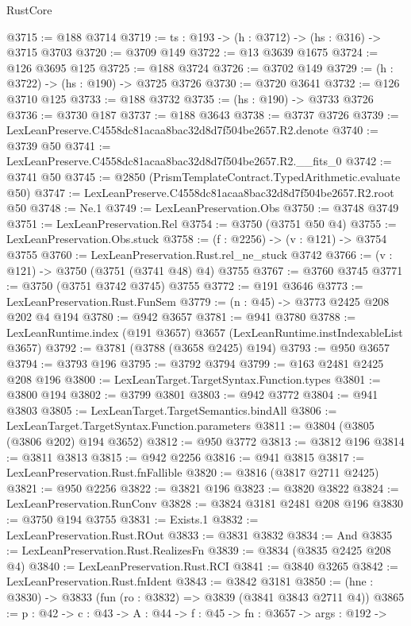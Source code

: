 \begin{lexlean}{RustCore}
\begin{coremodule}
@3715 := @188 @3714
@3719 := {ts : @193} -> (h : @3712) -> (hs : @316) -> @3715 @3703
@3720 := @3709 @149
@3722 := @13 @3639 @1675
@3724 := @126 @3695 @125
@3725 := @188 @3724
@3726 := @3702 @149
@3729 := (h : @3722) -> (hs : @190) -> @3725 @3726
@3730 := @3720 @3641
@3732 := @126 @3710 @125
@3733 := @188 @3732
@3735 := (hs : @190) -> @3733 @3726
@3736 := @3730 @187
@3737 := @188 @3643
@3738 := @3737 @3726
@3739 := LexLeanPreserve.C4558dc81acaa8bac32d8d7f504be2657.R2.denote
@3740 := @3739 @50
@3741 := LexLeanPreserve.C4558dc81acaa8bac32d8d7f504be2657.R2.__fits_0
@3742 := @3741 @50
@3745 := @2850 (PrismTemplateContract.TypedArithmetic.evaluate @50)
@3747 := LexLeanPreserve.C4558dc81acaa8bac32d8d7f504be2657.R2.root @50
@3748 := Ne.{1}
@3749 := LexLeanPreservation.Obs
@3750 := @3748 @3749
@3751 := LexLeanPreservation.Rel
@3754 := @3750 (@3751 @50 @4)
@3755 := LexLeanPreservation.Obs.stuck
@3758 := (f : @2256) -> (v : @121) -> @3754 @3755
@3760 := LexLeanPreservation.Rust.rel_ne_stuck @3742
@3766 := (v : @121) -> @3750 (@3751 (@3741 @48) @4) @3755
@3767 := @3760 @3745
@3771 := @3750 (@3751 @3742 @3745) @3755
@3772 := @191 @3646
@3773 := LexLeanPreservation.Rust.FunSem
@3779 := (n : @45) -> @3773 @2425 @208 @202 @4 @194
@3780 := @942 @3657
@3781 := @941 @3780
@3788 := LexLeanRuntime.index (@191 @3657) @3657 (LexLeanRuntime.instIndexableList @3657)
@3792 := @3781 (@3788 (@3658 @2425) @194)
@3793 := @950 @3657
@3794 := @3793 @196
@3795 := @3792 @3794
@3799 := @163 @2481 @2425 @208 @196
@3800 := LexLeanTarget.TargetSyntax.Function.types
@3801 := @3800 @194
@3802 := @3799 @3801
@3803 := @942 @3772
@3804 := @941 @3803
@3805 := LexLeanTarget.TargetSemantics.bindAll
@3806 := LexLeanTarget.TargetSyntax.Function.parameters
@3811 := @3804 (@3805 (@3806 @202) @194 @3652)
@3812 := @950 @3772
@3813 := @3812 @196
@3814 := @3811 @3813
@3815 := @942 @2256
@3816 := @941 @3815
@3817 := LexLeanPreservation.Rust.fnFallible
@3820 := @3816 (@3817 @2711 @2425)
@3821 := @950 @2256
@3822 := @3821 @196
@3823 := @3820 @3822
@3824 := LexLeanPreservation.RunConv
@3828 := @3824 @3181 @2481 @208 @196
@3830 := @3750 @194 @3755
@3831 := Exists.{1}
@3832 := LexLeanPreservation.Rust.ROut
@3833 := @3831 @3832
@3834 := And
@3835 := LexLeanPreservation.Rust.RealizesFn
@3839 := @3834 (@3835 @2425 @208 @4)
@3840 := LexLeanPreservation.Rust.RCI
@3841 := @3840 @3265
@3842 := LexLeanPreservation.Rust.fnIdent
@3843 := @3842 @3181
@3850 := (hne : @3830) -> @3833 (fun (ro : @3832) => @3839 (@3841 @3843 @2711 @4))
@3865 := {p : @42} ->
  {c : @43} ->
  {A : @44} ->
  {f : @45} ->
  {fn : @3657} ->
  {args : @192} ->

\end{coremodule}
\end{lexlean}
